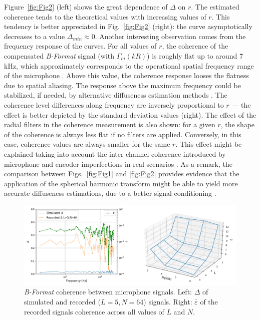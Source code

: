 Figure~\ref{fig:Fig2} (left) shows the great dependence of $\Delta$ on $r$.  The estimated coherence tends to the theoretical values with increasing values of $r$. This tendency is better appreciated in Fig.~\ref{fig:Fig2} (right): the curve asymptotically decreases to a value $\Delta_{min}\approx0$.
Another interesting observation comes from the frequency response of the curves. For all values of $r$, the coherence of the compensated \textit{B-Format} signal (with $\Gamma_m(kR)$) is roughly flat up to around 7 kHz, which approximately corresponds to the operational spatial frequency range of the microphone \cite{gerzon_design_1975}.
Above this value, the coherence response looses the flatness due to spatial aliasing. The response above the maximum frequency could be stabilized, if needed, by alternative diffuseness estimation methods \cite{politis_direction--arrival_2015}.
The coherence level differences along frequency are inversely proportional to $r$ --- the effect is better depicted by the standard deviation values (right).
The effect of the radial filters in the coherence measurement is also shown: for a given $r$, the shape of the coherence is always less flat if no filters are applied. Conversely, in this case, coherence values are always smaller for the same $r$. This effect might be explained taking into account the inter-channel coherence introduced by microphone and encoder imperfections in real scenarios \cite{schorkhuber_ambisonic_2017}.
As a remark, the comparison between Figs.~\ref{fig:Fig1} and \ref{fig:Fig2} provides evidence that the application of the spherical harmonic transform might be able to yield more accurate diffuseness estimations, due to a better signal conditioning \cite{epain_spherical_2016}.\\



\begin{figure}
	\includegraphics[width=\textwidth]{Figures/CoherenceEstimation/Figure3}
	\caption{\label{fig:Fig3}\textit{B-Format} coherence between microphone signals. Left: $\Delta$ of simulated and recorded ($L=5, N=64$) signals. Right: $\bar{\varepsilon}$ of the recorded signals coherence across all values of $L$ and $N$.}
\end{figure}

